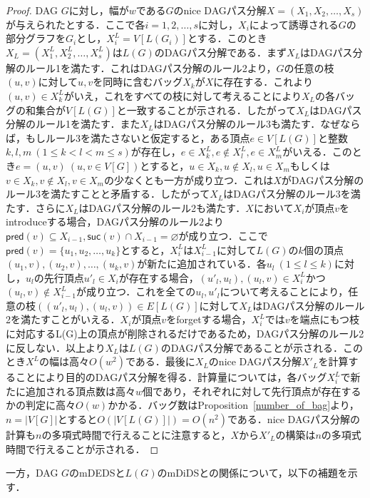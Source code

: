 \documentclass[master]{kuisthesis}		%
\theoremstyle{plain}
\theoremstyle{definition}
\begin{document}
\begin{proof}
    DAG $G$に対し，幅が$w$である$G$のnice DAGパス分解$X=(X_1, X_2, \dots, X_s)$が与えられたとする．ここで各$i=1, 2, \dots, s$に対し，$X_i$によって誘導される$G$の部分グラフを$G_i$とし，$X^L_i = V[L(G_i)]$とする．このとき$X_L=(X^L_1, X^L_2, \dots, X^L_s)$は$L(G)$のDAGパス分解である．まず$X_L$はDAGパス分解のルール1を満たす．これはDAGパス分解のルール2より，$G$の任意の枝$(u, v)$に対して$u, v$を同時に含むバッグ$X_k$が$X$に存在する．これより$(u, v)\in X^L_k$がいえ，これをすべての枝に対して考えることにより$X_L$の各バッグの和集合が$V[L(G)]$と一致することが示される．したがって$X_L$はDAGパス分解のルール1を満たす．また$X_L$はDAGパス分解のルール3も満たす．なぜならば，もしルール3を満たさないと仮定すると，ある頂点$e\in V[L(G)]$と整数$k, l, m\ (1 \leq k < l < m \leq s)$が存在し，$e\in X^L_k, e\notin X^L_l, e\in X^L_m$がいえる．このとき$e=(u, v)\ (u, v \in V[G])$とすると，$u\in X_k, u\notin X_l, u\in X_m$もしくは$v\in X_k, v\notin X_l, v\in X_m$の少なくとも一方が成り立つ．これは$X$がDAGパス分解のルール3を満たすことと矛盾する．したがって$X_L$はDAGパス分解のルール3を満たす．さらに$X_L$はDAGパス分解のルール2も満たす．$X$において$X_i$が頂点$v$をintroduceする場合，DAGパス分解のルール2より$\mathsf{pred}(v)\subseteq X_{i-1}, \mathsf{suc}(v)\cap X_{i-1} = \varnothing$が成り立つ．ここで$\mathsf{pred}(v)=\{u_1, u_2, \dots, u_k\}$とすると，$X^L_i$は$X^L_{i-1}$に対して$L(G)$の$k$個の頂点$(u_1, v), (u_2, v), \dots, (u_k, v)$が新たに追加されている．各$u_l\ (1\leq l \leq k)$に対し，$u_l$の先行頂点$u'_l \in X_i$が存在する場合，$(u'_l, u_l), (u_l, v) \in X^L_i$かつ$(u_l, v) \notin X^L_{i-1}$が成り立つ．これを全ての$u_l, u'_l$について考えることにより，任意の枝$((u'_l, u_l), (u_l, v)) \in E[L(G)]$に対して$X_L$はDAGパス分解のルール2を満たすことがいえる．$X_i$が頂点$v$をforgetする場合，$X^L_i$では$v$を端点にもつ枝に対応するL(G)上の頂点が削除されるだけであるため，DAGパス分解のルール2に反しない．以上より$X_L$は$L(G)$のDAGパス分解であることが示される．このとき$X^L$の幅は高々$O(w^2)$である．最後に$X_L$のnice DAGパス分解$X'_L$を計算することにより目的のDAGパス分解を得る．計算量については，各バッグ$X^L_i$で新たに追加される頂点数は高々$w$個であり，それぞれに対して先行頂点が存在するかの判定に高々$O(w)$かかる．バッグ数はProposition~\ref{number_of_bag}より，$n=|V[G]|$とすると$O(|V[L(G)]|)=O(n^2)$である．nice DAGパス分解の計算も$n$の多項式時間で行えることに注意すると，$X$から$X'_L$の構築は$n$の多項式時間で行えることが示される．
\end{proof}

一方，DAG $G$のmDEDSと$L(G)$のmDiDSとの関係について，以下の補題を示す．
\end{document}
